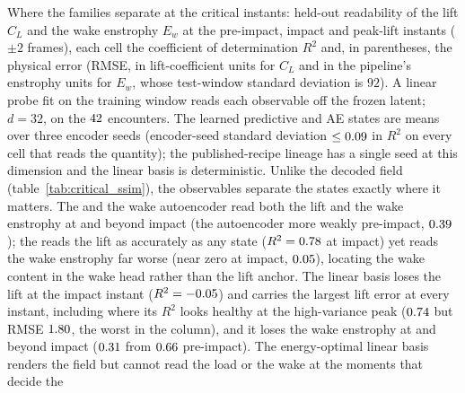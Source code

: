 \begin{table}
  \centering
  \caption{Where the families separate at the critical instants: held-out
  readability of the lift $C_L$ and the wake enstrophy $E_w$ at the pre-impact,
  impact and peak-lift instants ($\pm 2$ frames), each cell the coefficient of
  determination $R^2$ and, in parentheses, the physical error (RMSE, in
  lift-coefficient units for $C_L$ and in the pipeline's enstrophy units for
  $E_w$, whose test-window standard deviation is $92$). A linear probe fit on the
  training window reads each observable off the frozen latent; $d = 32$, on the
  $\NTestBEnc$ \TestSplit{} encounters. The learned predictive and AE states are
  means over three encoder seeds (encoder-seed standard deviation
  $\le \CritSeedSd$ in $R^2$ on every cell that reads the quantity); the
  published-recipe lineage has a single seed at this dimension and the linear
  basis is deterministic. Unlike the decoded field
  (table~\ref{tab:critical_ssim}), the observables separate the states exactly
  where it matters. The \PredState{} and the
  wake autoencoder read both the lift and the wake enstrophy at and beyond
  impact (the autoencoder more weakly pre-impact, $\CritEwAePre$);
  the \LiftState{} reads the lift as accurately as any
  state ($R^2 = \CritClClnImp$ at impact) yet reads the wake enstrophy far worse
  (near zero at impact, $\CritEwClnImp$), locating the wake content in the wake
  head rather than the lift anchor. The linear basis loses the lift at the impact
  instant ($R^2 = \CritClPodImp$) and carries the largest lift error at every
  instant, including where its $R^2$ looks healthy at the high-variance peak
  ($\CritClPodPeak$ but RMSE $\CritClRmsePodPeak$, the worst in the column), and
  it loses the wake enstrophy at and beyond impact ($\CritEwPodImp$ from
  $\CritEwPodPre$ pre-impact). The energy-optimal linear basis renders the
  field but cannot read the load or the wake at the moments that decide the
}
\end{table}
